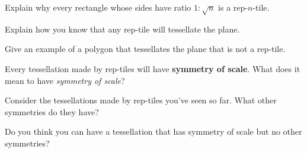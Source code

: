 \begin{prob}
Explain why every rectangle whose sides have ratio $1:\sqrt{n}$ is a
rep-$n$-tile.
\end{prob}

\begin{prob}
Explain how you know that any rep-tile will tessellate the plane.
\end{prob}

\begin{prob}
Give an example of a polygon that tessellates the plane that is not a
rep-tile.
\end{prob}


\begin{prob}
Every tessellation made by rep-tiles will have \textbf{symmetry of scale}. What does it mean to have \textit{symmetry of scale}?
\end{prob}

\begin{prob}
Consider the tessellations made by rep-tiles you've seen so far. What
other symmetries do they have?
\end{prob}

\begin{prob}
Do you think you can have a tessellation that has symmetry of scale
but no other symmetries?
\end{prob}
